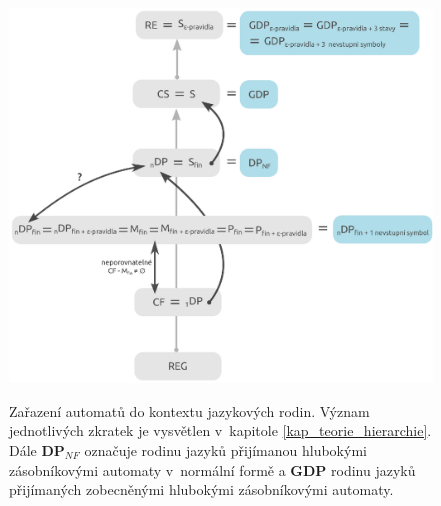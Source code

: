 \begin{figure}[ht]
\centering
\includegraphics{img/bp_hierarchy03.eps} \bigskip \\
\caption{Zařazení automatů do kontextu jazykových rodin. Význam jednotlivých zkratek je vysvětlen v~kapitole \ref{kap_teorie_hierarchie}. Dále \textbf{DP${}_{NF}$} označuje rodinu jazyků přijímanou hlubokými zásobníkovými automaty v~normální formě a \textbf{GDP} rodinu jazyků přijímaných zobecněnými hlubokými zásobníkovými automaty.}
\label{obr_model02_hierarchy}
\end{figure}



